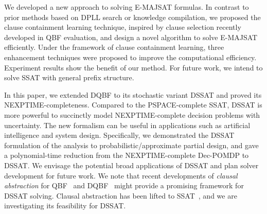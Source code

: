     We developed a new approach to solving E-MAJSAT formulas. In contrast to prior methods based on DPLL search or knowledge compilation, we proposed the clause containment learning technique, inspired by clause selection recently developed in QBF evaluation, and design a novel algorithm to solve E-MAJSAT efficiently. Under the framework of clause containment learning, three enhancement techniques were proposed to improve the computational efficiency.
    Experiment results show the benefit of our method.
    For future work, we intend to solve SSAT with general prefix structure.

    In this paper, we extended DQBF to its stochastic variant DSSAT and proved its NEXPTIME-completeness.
    Compared to the PSPACE-complete SSAT, DSSAT is more powerful to succinctly model NEXPTIME-complete decision problems with uncertainty.
    The new formalism can be useful in applications such as artificial intelligence and system design.
    Specifically, we demonstrated the DSSAT formulation of the analysis to probabilistic/approximate partial design, and gave a polynomial-time reduction from the NEXPTIME-complete Dec-POMDP to DSSAT.
    We envisage the potential broad applications of DSSAT and plan solver development for future work.
    We note that recent developments of \textit{clausal abstraction} for QBF~\cite{JanotaM15,RabeT15} and DQBF~\cite{Tentrup19} might provide a promising framework for DSSAT solving.
    Clausal abstraction has been lifted to SSAT~\cite{ChenHJ21}, and we are investigating its feasibility for DSSAT.
\fi